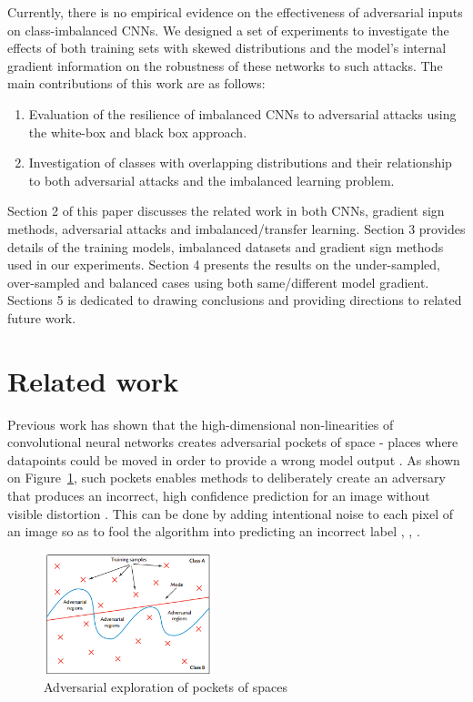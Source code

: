 \documentclass[runningheads,a4paper]{llncs}
\begin{document}
Currently, there is no empirical evidence on the effectiveness of adversarial inputs on class-imbalanced CNNs. We designed a set of experiments to investigate the effects of both training sets with skewed distributions and the model's internal gradient information on the robustness of these networks to such attacks. The main contributions of this work are as follows: 
\begin{enumerate}
\item Evaluation of the resilience of imbalanced CNNs to adversarial attacks using the white-box and black box approach.
\item Investigation of classes with overlapping distributions and their relationship to both adversarial attacks and the imbalanced learning problem.
\end{enumerate}

Section 2 of this paper discusses the related work in both CNNs, gradient sign methods, adversarial attacks and imbalanced/transfer learning. Section 3 provides details of the training models, imbalanced datasets and gradient sign methods used in our experiments. Section 4 presents the results on the under-sampled, over-sampled and balanced cases using both same/different model gradient. Sections 5 is dedicated to drawing conclusions and providing directions to related future work.
\section{Related work}


Previous work has shown that the high-dimensional non-linearities of convolutional neural networks \cite{lawrence1997face} creates adversarial pockets of space - places where datapoints could be moved in order to provide a wrong model output . As shown on Figure~\ref{fig:adv_space}, such pockets enables methods to deliberately create an adversary that produces an incorrect, high confidence prediction for an image without visible distortion \cite{papernot_thesis_2016}. This can be done by adding intentional noise to each pixel of an image so as to fool the algorithm into predicting an incorrect label \cite{goodfellow2014}, \cite{papernot2016transf}, \cite{szegedy2013}.

\begin{figure}
	\centering
	\includegraphics[height=3.5cm]{adv_space.png}
	\caption{Adversarial exploration of pockets of spaces \cite{papernot_2017}}
	\label{fig:adv_space}
\end{figure}
\end{document}
